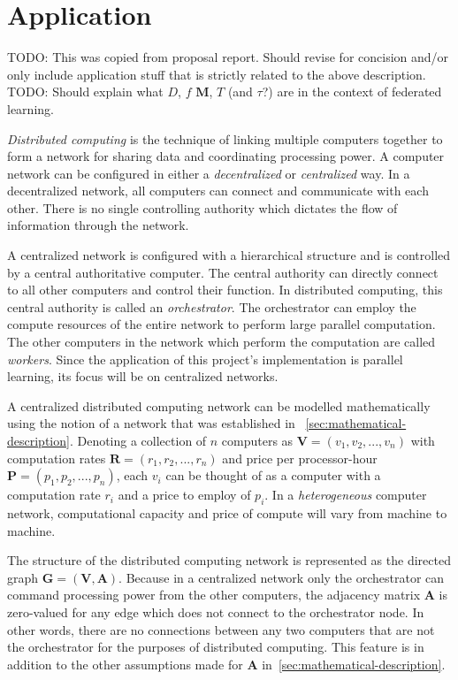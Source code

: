 \documentclass[../mthe-493-final-project.tex]{subfiles}
\begin{document}
    
    \section{Application}
    \label{sec:Application}
    
    TODO: This was copied from proposal report. Should revise for concision and/or only include application stuff that is strictly related to the above description.
    TODO: Should explain what $D$, $f$ $\mathbf{M}$, $T$ (and $\tau$?) are in the context of federated learning.

    \textit{Distributed computing} is the technique of linking multiple computers together to form a network for sharing data and coordinating processing power. A computer network can be configured in either a \textit{decentralized} or \textit{centralized} way. In a decentralized network, all computers can connect and communicate with each other. There is no single controlling authority which dictates the flow of information through the network.

    A centralized network is configured with a hierarchical structure and is controlled by a central authoritative computer. The central authority can directly connect to all other computers and control their function. In distributed computing, this central authority is called an \textit{orchestrator}. The orchestrator can employ the compute resources of the entire network to perform large parallel computation. The other computers in the network which perform the computation are called \textit{workers}. Since the application of this project's implementation is parallel learning, its focus will be on centralized networks.

    A centralized distributed computing network can be modelled mathematically using the notion of a network that was established in ~\autoref{sec:mathematical-description}. Denoting a collection of $n$ computers as $\mathbf{V} = (v_1, v_2, ..., v_n)$ with computation rates $\mathbf{R} = (r_1, r_2, ..., r_n)$ and price per processor-hour $\mathbf{P} = (p_1, p_2, ..., p_n)$, each $v_i$ can be thought of as a computer with a computation rate $r_i$ and a price to employ of $p_i$. In a \textit{heterogeneous} computer network, computational capacity and price of compute will vary from machine to machine.

    The structure of the distributed computing network is represented as the directed graph $\mathbf{G} = (\mathbf{V}, \mathbf{A})$. Because in a centralized network only the orchestrator can command processing power from the other computers, the adjacency matrix $\mathbf{A}$ is zero-valued for any edge which does not connect to the orchestrator node. In other words, there are no connections between any two computers that are not the orchestrator for the purposes of distributed computing. This feature is in addition to the other assumptions made for $\mathbf{A}$ in~\autoref{sec:mathematical-description}.
\end{document}
